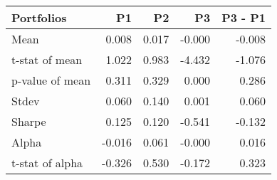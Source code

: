 \begin{tabular}{lrrrr}
\toprule
Portfolios & P1 & P2 & P3 & P3 - P1 \\
\midrule
Mean & 0.008 & 0.017 & -0.000 & -0.008 \\
t-stat of mean & 1.022 & 0.983 & -4.432 & -1.076 \\
p-value of mean & 0.311 & 0.329 & 0.000 & 0.286 \\
Stdev & 0.060 & 0.140 & 0.001 & 0.060 \\
Sharpe & 0.125 & 0.120 & -0.541 & -0.132 \\
Alpha & -0.016 & 0.061 & -0.000 & 0.016 \\
t-stat of alpha & -0.326 & 0.530 & -0.172 & 0.323 \\
\bottomrule
\end{tabular}
